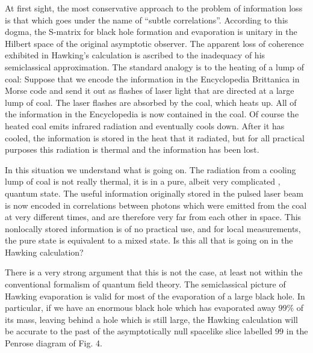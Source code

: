 At first sight, the most conservative approach to the problem of information
loss
 is that which goes under the name of ``subtle correlations''.  According to
this dogma, the S-matrix for black hole formation and evaporation is unitary in
the Hilbert space of the original asymptotic observer.  The apparent loss of
coherence exhibited in Hawking's calculation is ascribed to the inadequacy of
his semiclassical approximation.  The standard analogy is to the heating
of a lump of coal:  Suppose that we encode the information in the Encyclopedia
Brittanica in Morse code and send it out as flashes of laser light that
are
 directed
 at a large lump of coal.  The laser flashes are absorbed by the coal,
which heats up.  All of the information in the Encyclopedia is now contained
in the coal.  Of course the heated coal emits infrared radiation and eventually
cools down.  After it has cooled, the information is stored in the heat that
it radiated, but for all practical purposes this radiation is thermal and the
information has been lost.

In this situation we understand what is going on.  The radiation from a
cooling
lump of coal is not really thermal, it is in a pure, albeit very complicated
, quantum state.  The useful information originally stored in the pulsed laser
beam is now encoded in correlations between photons which were emitted from the
coal at very different times, and are therefore very far from each other in
space.  This nonlocally stored information is of no practical use, and for
local
measurements, the pure state is equivalent to a mixed state.  Is this all
that
is going on in the Hawking calculation?

There is a very strong argument that this is not the case, at least not within
the
conventional formalism of quantum field theory.  The semiclassical
picture of Hawking evaporation is valid for most of the evaporation of a large
black hole.  In particular, if we have an enormous black hole which has
evaporated away $99\%$ of its mass, leaving behind a hole which is still
large,
the Hawking calculation will be accurate to the past of the asymptotically
null spacelike slice labelled $99$ in the Penrose diagram of Fig. 4.


